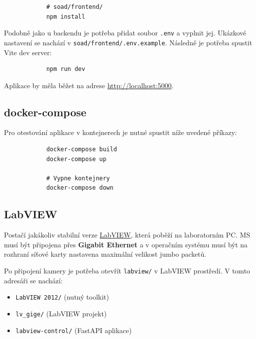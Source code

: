 \documentclass[12pt]{article}
\begin{document}
\begin{teamwork}
        \begin{verbatim}
            # soad/frontend/
            npm install
        \end{verbatim}

        Podobně jako u backendu je potřeba přidat soubor \texttt{.env} a vyplnit jej.
        Ukázkové nastavení se nachází v
        \texttt{soad/frontend/.env.example}.
        Následně je potřeba spustit Vite dev server:

        \begin{verbatim}
            npm run dev
        \end{verbatim}

        Aplikace by měla běžet na adrese \href{http://localhost:5000}{http://localhost:5000}.

        \subsection{docker-compose}\label{subsec:docker-compose}

        Pro otestování aplikace v kontejnerech je nutné spustit níže uvedené příkazy:

        \begin{verbatim}
            docker-compose build
            docker-compose up

            # Vypne kontejnery
            docker-compose down
        \end{verbatim}

        \subsection{LabVIEW}\label{subsec:labview}

        Postačí jakákoliv stabilní verze \href{https://www.ni.com/en/support/downloads/software-products/download.labview.html#559067}{LabVIEW}, která poběží na laboratorním PC\@.
        MS musí být připojena přes \textbf{Gigabit Ethernet} a v operačním systému musí být
        na rozhraní síťové karty nastavena maximální velikost jumbo packetů.

        Po připojení kamery je potřeba otevřít \texttt{labview/} v LabVIEW prostředí.
        V tomto adresáři se nachází:
        \begin{itemize}
            \item \texttt{LabVIEW 2012/} (nutný toolkit)
            \item \texttt{lv\_gige/} (LabVIEW projekt)
            \item \texttt{labview-control/} (FastAPI aplikace)
        \end{itemize}


\end{teamwork}
\end{document}
